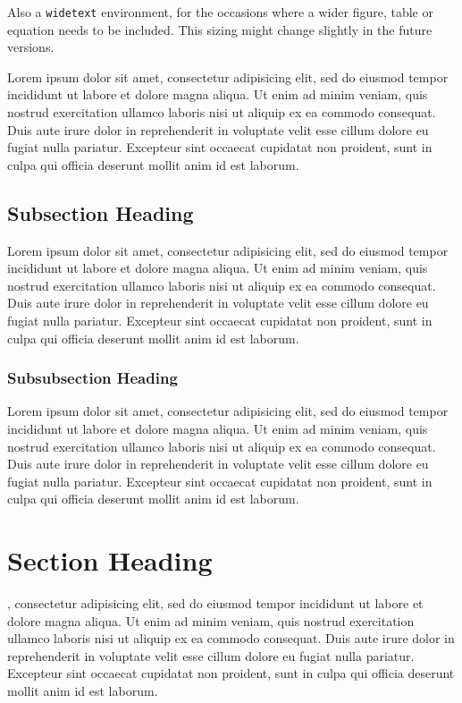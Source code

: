 \documentclass[11pt]{penrose}
\begin{document}
Also a \texttt{widetext} environment, for the occasions where a wider figure, table or equation needs to be included. This sizing might change slightly in the future versions.
\begin{widetext}
  Lorem ipsum dolor sit amet, consectetur adipisicing elit, sed do eiusmod tempor incididunt ut labore et dolore magna aliqua. Ut enim ad minim veniam, quis nostrud exercitation ullamco laboris nisi ut aliquip ex ea commodo consequat. Duis aute irure dolor in reprehenderit in voluptate velit esse cillum dolore eu fugiat nulla pariatur. Excepteur sint occaecat cupidatat non proident, sunt in culpa qui officia deserunt mollit anim id est laborum.
\end{widetext}

\subsection{Subsection Heading}
Lorem ipsum dolor sit amet, consectetur adipisicing elit, sed do eiusmod tempor incididunt ut labore et dolore magna aliqua. Ut enim ad minim veniam, quis nostrud exercitation ullamco laboris nisi ut aliquip ex ea commodo consequat. Duis aute irure dolor in reprehenderit in voluptate velit esse cillum dolore eu fugiat nulla pariatur. Excepteur sint occaecat cupidatat non proident, sunt in culpa qui officia deserunt mollit anim id est laborum.

  \subsubsection{Subsubsection Heading}
  Lorem ipsum dolor sit amet, consectetur adipisicing elit, sed do eiusmod tempor incididunt ut labore et dolore magna aliqua. Ut enim ad minim veniam, quis nostrud exercitation ullamco laboris nisi ut aliquip ex ea commodo consequat. Duis aute irure dolor in reprehenderit in voluptate velit esse cillum dolore eu fugiat nulla pariatur. Excepteur sint occaecat cupidatat non proident, sunt in culpa qui officia deserunt mollit anim id est laborum.

\section{Section Heading}
, consectetur adipisicing elit, sed do eiusmod tempor incididunt ut labore et dolore magna aliqua. Ut enim ad minim veniam, quis nostrud exercitation ullamco laboris nisi ut aliquip ex ea commodo consequat. Duis aute irure dolor in reprehenderit in voluptate velit esse cillum dolore eu fugiat nulla pariatur. Excepteur sint occaecat cupidatat non proident, sunt in culpa qui officia deserunt mollit anim id est laborum.
\end{document}
